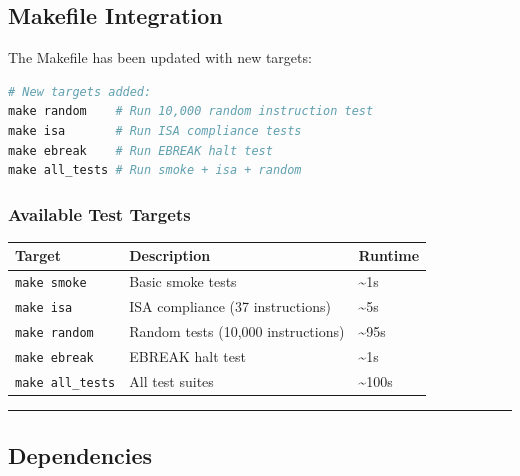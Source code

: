 \subsection{Makefile Integration}\label{cr:status:random-tests-status:makefile-integration}

\begin{record}

The Makefile has been updated with new targets:

\begin{lstlisting}[language=make]
# New targets added:
make random    # Run 10,000 random instruction test
make isa       # Run ISA compliance tests
make ebreak    # Run EBREAK halt test
make all_tests # Run smoke + isa + random
\end{lstlisting}

\end{record}

\subsubsection{Available Test Targets}\label{cr:status:random-tests-status:available-test-targets}

\begin{record}

{
\begin{longtable}[]{@{}lll@{}}
\toprule\noalign{}
Target & Description & Runtime \\
\midrule\noalign{}
\endhead
\bottomrule\noalign{}
\endlastfoot
\texttt{make\ smoke} & Basic smoke tests & \textasciitilde1s \\
\texttt{make\ isa} & ISA compliance (37 instructions) &
\textasciitilde5s \\
\texttt{make\ random} & Random tests (10,000 instructions) &
\textasciitilde95s \\
\texttt{make\ ebreak} & EBREAK halt test & \textasciitilde1s \\
\texttt{make\ all\_\allowbreak{}tests} & All test suites &
\textasciitilde100s \\
\end{longtable}
}

\begin{center}\rule{0.5\linewidth}{0.5pt}\end{center}

\end{record}

\subsection{Dependencies}\label{cr:status:random-tests-status:dependencies}

